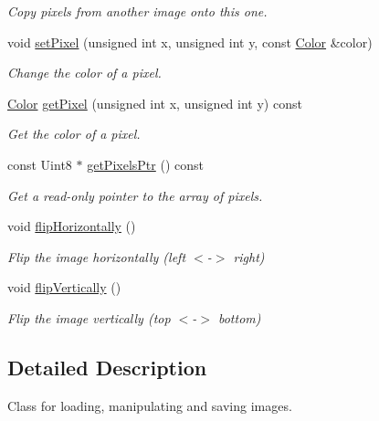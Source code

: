 \begin{DoxyCompactItemize}
\begin{DoxyCompactList}\small\item\em Copy pixels from another image onto this one. \end{DoxyCompactList}\item 
void \hyperlink{classsf_1_1_image_a9fd329b8cd7d4439e07fb5d3bb2d9744}{set\+Pixel} (unsigned int x, unsigned int y, const \hyperlink{classsf_1_1_color}{Color} \&color)
\begin{DoxyCompactList}\small\item\em Change the color of a pixel. \end{DoxyCompactList}\item 
\hyperlink{classsf_1_1_color}{Color} \hyperlink{classsf_1_1_image_acf278760458433b2c3626a6980388a95}{get\+Pixel} (unsigned int x, unsigned int y) const
\begin{DoxyCompactList}\small\item\em Get the color of a pixel. \end{DoxyCompactList}\item 
const Uint8 $\ast$ \hyperlink{classsf_1_1_image_ad9562b126fc8d5efcf608166992865c7}{get\+Pixels\+Ptr} () const
\begin{DoxyCompactList}\small\item\em Get a read-\/only pointer to the array of pixels. \end{DoxyCompactList}\item 
\mbox{\label{classsf_1_1_image_a57168e7bc29190e08bbd6c9c19f4bb2c}} 
void \hyperlink{classsf_1_1_image_a57168e7bc29190e08bbd6c9c19f4bb2c}{flip\+Horizontally} ()
\begin{DoxyCompactList}\small\item\em Flip the image horizontally (left $<$-\/$>$ right) \end{DoxyCompactList}\item 
\mbox{\label{classsf_1_1_image_a78a702a7e49d1de2dec9894da99d279c}} 
void \hyperlink{classsf_1_1_image_a78a702a7e49d1de2dec9894da99d279c}{flip\+Vertically} ()
\begin{DoxyCompactList}\small\item\em Flip the image vertically (top $<$-\/$>$ bottom) \end{DoxyCompactList}\end{DoxyCompactItemize}


\subsection{Detailed Description}
Class for loading, manipulating and saving images. 

